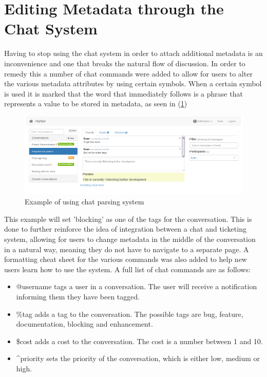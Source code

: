 \documentclass{l4proj}
\begin{document}
\section{Editing Metadata through the Chat System}

Having to stop using the chat system in order to attach additional metadata is an inconvenience and one that breaks the natural flow of discussion.  In order to remedy this a number of chat commands were added to allow for users to alter the various metadata attributes by using certain symbols. When a certain symbol is used it is marked that the word that immediately follows is a phrase that represents a value to be stored in metadata, as seen in (\ref{fig:10})

\begin{figure}[h]
\includegraphics[scale=0.75]{chat-parsing.png}
\centering
\caption{Example of using chat parsing system}
\label{fig:10}
\end{figure}
\newpage

This example will set 'blocking' as one of the tags for the conversation.  This is done to further reinforce the idea of integration between a chat and ticketing system, allowing for users to change metadata in the middle of the conversation in a natural way, meaning they do not have to navigate to a separate page.  A formatting cheat sheet for the various commands was also added to help new users learn how to use the system.  A full list of chat commands are as follows:

\begin{itemize}
\item @username tags a user in a conversation.  The user will receive a notification informing them they have been tagged.
\item \%tag adds a tag to the conversation.  The possible tags are bug, feature, documentation, blocking and enhancement.
\item \$cost adds a cost to the conversation.  The cost is a number between 1 and 10.
\item \textasciicircum priority sets the priority of the conversation, which is either low, medium or high.
\end{itemize}
\end{document}
